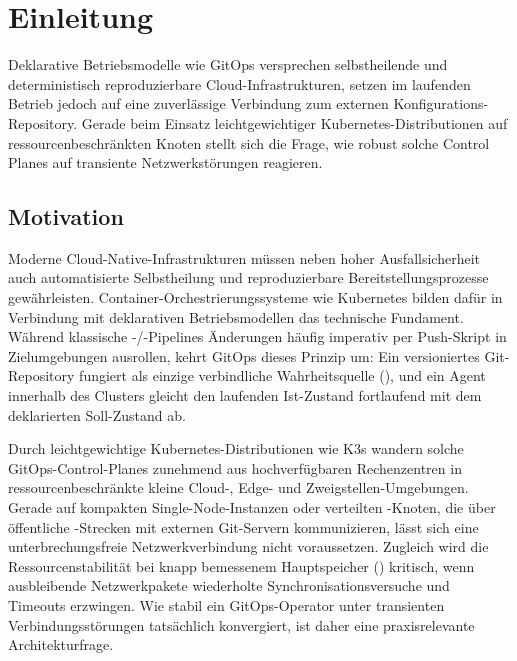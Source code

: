 \chapter{Einleitung}
\label{chap:einleitung}

Deklarative Betriebsmodelle wie GitOps versprechen selbstheilende und deterministisch reproduzierbare Cloud-Infrastrukturen, setzen im laufenden Betrieb jedoch auf eine zuverlässige Verbindung zum externen Konfigurations-Repository. Gerade beim Einsatz leichtgewichtiger Kubernetes-Distributionen auf ressourcenbeschränkten Knoten stellt sich die Frage, wie robust solche Control Planes auf transiente Netzwerkstörungen reagieren.

\section{Motivation}
\label{sec:motivation}

Moderne Cloud-Native-Infrastrukturen müssen neben hoher Ausfallsicherheit auch automatisierte Selbstheilung und reproduzierbare Bereitstellungsprozesse gewährleisten. Container-Orchestrierungssysteme wie Kubernetes bilden dafür in Verbindung mit deklarativen Betriebsmodellen das technische Fundament.\autocite{burns_borg_2016} Während klassische -/-Pipelines Änderungen häufig imperativ per Push-Skript in Zielumgebungen ausrollen, kehrt GitOps dieses Prinzip um: Ein versioniertes Git-Repository fungiert als einzige verbindliche Wahrheitsquelle (\textit{}), und ein Agent innerhalb des Clusters gleicht den laufenden Ist-Zustand fortlaufend mit dem deklarierten Soll-Zustand ab.\autocite{beetz_gitops_2022,opengitops_principles_2021}

Durch leichtgewichtige Kubernetes-Distributionen wie K3s wandern solche GitOps-Control-Planes zunehmend aus hochverfügbaren Rechenzentren in ressourcenbeschränkte kleine Cloud-, Edge- und Zweigstellen-Umgebungen.\autocite{k3s_architecture_2026} Gerade auf kompakten Single-Node-Instanzen oder verteilten -Knoten, die über öffentliche -Strecken mit externen Git-Servern kommunizieren, lässt sich eine unterbrechungsfreie Netzwerkverbindung nicht voraussetzen. Zugleich wird die Ressourcenstabilität bei knapp bemessenem Hauptspeicher () kritisch, wenn ausbleibende Netzwerkpakete wiederholte Synchronisationsversuche und Timeouts erzwingen. Wie stabil ein GitOps-Operator unter transienten Verbindungsstörungen tatsächlich konvergiert, ist daher eine praxisrelevante Architekturfrage.

